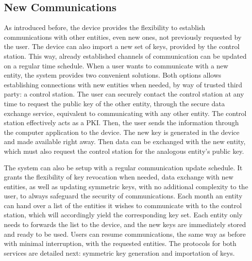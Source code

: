 

\subsection{New Communications}\label{chap:arch:services:new-comms}

As introduced before, the device provides the flexibility to establish communications with other entities, even new ones, not previously requested by the user.
The device can also import a new set of keys, provided by the control station.
This way, already established channels of communication can be updated on a regular time schedule.
When a user wants to communicate with a new entity, the system provides two convenient solutions.
Both options allows establishing connections with new entities when needed, by way of trusted third party: a control station. 
The user can securely contact the control station at any time to request the public key of the other entity, through the secure data exchange service, equivalent to communicating with any other entity. The control station effectively acts as a PKI.
Then, the user sends the information through the computer application to the device. The new key is generated in the device and made available right away. Then data can be exchanged with the new entity, which must also request the control station for the analogous entity's public key.

The system can also be setup with a regular communication update schedule. It grants the flexibility of key revocation when needed, data exchange with new entities, as well as updating symmetric keys, with no additional complexity to the user, to always safeguard the security of communications.
Each month an entity can hand over a list of the entities it wishes to communicate with to the control station, which will accordingly yield the corresponding key set.
Each entity only needs to forwards the list to the device, and the new keys are immediately stored and ready to be used.
Users can resume communications, the same way as before with minimal interruption, with the requested entities.
The protocols for both services are detailed next: symmetric key generation and importation of keys.

